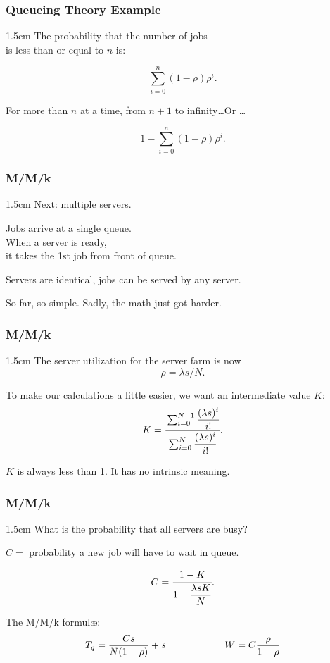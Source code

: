 \begin{frame}
\frametitle{Queueing Theory Example}

\large
\begin{changemargin}{1.5cm}
The probability that the number of jobs\\
 is less than or equal to $n$ is: 

\[ \sum\limits_{i=0}^{n}(1-\rho)\rho^{i}. \]

For more than $n$ at a time, from $n+1$ to infinity\ldots Or \ldots

\[ 1 - \sum\limits_{i=0}^{n}(1-\rho)\rho^{i}. \]
\end{changemargin}

\end{frame}



\begin{frame}
\frametitle{M/M/k}

\large
\begin{changemargin}{1.5cm}
Next: multiple servers.

Jobs arrive at a single queue. \\
When a server is ready, \\
it takes the 1st job from front of queue. 

Servers are identical, jobs can be served by any server. 

So far, so simple. Sadly, the math just got harder. 
\end{changemargin}

\end{frame}




\begin{frame}
\frametitle{M/M/k}

\large
\begin{changemargin}{1.5cm}
The server utilization for the server farm is now 
\[ \rho = \lambda s / N. \]

To make our calculations a little easier, we want an intermediate value $K$:
\[ K = \cfrac{\sum_{i=0}^{N-1}\dfrac{(\lambda s)^{i}}{i!}}{{\sum_{i=0}^{N}\dfrac{(\lambda s)^{i}}{i!}}}.\]

$K$ is always less than 1. It has no intrinsic meaning.
\end{changemargin}

\end{frame}

\begin{frame}
\frametitle{M/M/k}

\large
\begin{changemargin}{1.5cm}
What is the probability that all servers are busy? 

$C = $ probability a new job will have to wait in queue.

\[
	C = \cfrac{1 - K}{1 - \dfrac{\lambda s K}{N}}.\]

The M/M/k formul\ae: \\[0em]

\[ T_{q} = \dfrac{C s}{N(1 - \rho)} + s \mbox{\qquad\qquad\qquad} W = C \dfrac{\rho}{1 - \rho} \]
\end{changemargin}

\end{frame}


